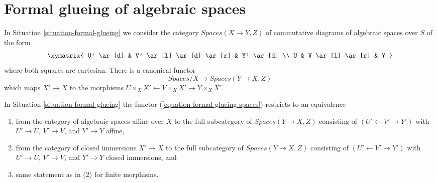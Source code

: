 \section{Formal glueing of algebraic spaces}
\label{section-formal-glueing-spaces}

\noindent
In Situation \ref{situation-formal-glueing} we consider the category
$\textit{Spaces}(X \to Y, Z)$
of commutative diagrams of algebraic spaces over $S$ of the form
$$
\xymatrix{
U' \ar[d] & V' \ar[l] \ar[d] \ar[r] & Y' \ar[d] \\
U & V \ar[l] \ar[r] & Y
}
$$
where both squares are cartesian. There is a canonical functor
\begin{equation}
\label{equation-formal-glueing-spaces}
\textit{Spaces}/X \longrightarrow \textit{Spaces}(Y \to X, Z)
\end{equation}
which maps $X' \to X$ to the morphisms
$U \times_X X' \leftarrow V \times_X X' \rightarrow Y \times_X X'$.

\begin{lemma}
\label{lemma-equivalence-on-affine}
In Situation \ref{situation-formal-glueing} the functor
(\ref{equation-formal-glueing-spaces}) restricts to an
equivalence
\begin{enumerate}
\item from the category of algebraic spaces affine over $X$
to the full subcategory of $\textit{Spaces}(Y \to X, Z)$ consisting
of $(U' \leftarrow V' \rightarrow Y')$ with $U' \to U$, $V' \to V$,
and $Y' \to Y$ affine,
\item from the category of closed immersions $X' \to X$
to the full subcategory of $\textit{Spaces}(Y \to X, Z)$ consisting
of $(U' \leftarrow V' \rightarrow Y')$ with $U' \to U$, $V' \to V$,
and $Y' \to Y$ closed immersions, and
\item same statement as in (2) for finite morphisms.
\end{enumerate}
\end{lemma}

